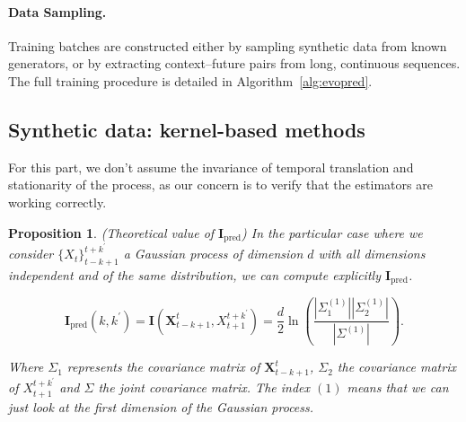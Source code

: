 \documentclass{article}
\newtheorem{proposition}[theorem]{Proposition}
\begin{document}
\paragraph{Data Sampling.}
Training batches are constructed either by sampling synthetic data from known generators, or by extracting context–future pairs from long, continuous sequences. The full training procedure is detailed in Algorithm~\ref{alg:evopred}.

\subsection{Synthetic data: kernel-based methods}\label{sub_section:synthetic_data_kernel}

For this part, we don't assume the invariance of temporal translation and stationarity of the process, as our concern is to verify that the estimators are working correctly.

\begin{proposition}
\label{prop:theoretical}(Theoretical value of $\mathbf{I}_{\text{pred}}$)
In the particular case where we consider $\{X_{t}\}_{t-k+1}^{t+k^\prime}$ a Gaussian process of dimension $d$ with all dimensions independent and of the same distribution, we can compute explicitly $\mathbf{I}_{\text{pred}}$.

$$\mathbf{I}_{\text{pred}}(k,k^\prime)=\mathbf{I}(\mathbf{X}_{t-k+1}^{t},{X}_{t+1}^{t+k^\prime})= \frac{d}{2} \ln \left(\frac{\left|\Sigma_1^{(1)}\right|\left|\Sigma_2^{(1)}\right|}{\left|\Sigma^{(1)}\right|}\right).$$

Where $\Sigma_1$ represents the covariance matrix of $\mathbf{X}_{t-k+1}^{t}$, $\Sigma_2$ the covariance matrix of ${X}_{t+1}^{t+k^\prime}$ and $\Sigma$ the joint covariance matrix. The index $(1)$ means that we can just look at the first dimension of the Gaussian process.
\end{proposition}
\end{document}
